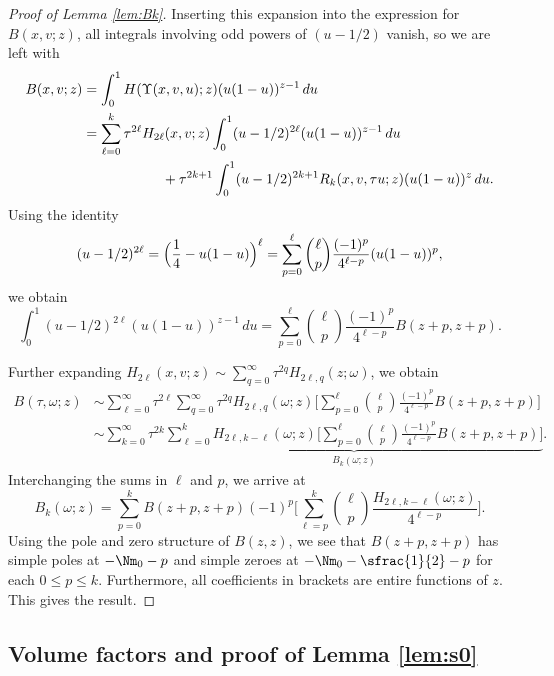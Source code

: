 \begin{proof}[Proof of Lemma \ref{lem:Bk}]
Inserting this expansion into the expression for $B(x,v; z)$, all integrals involving odd powers of $(u-1/2)$ vanish, so we
are left with
\begin{align*}
B(x,v; z) &= \int_0^1 H(\Upsilon(x,v,u); z) (u(1-u))^{z-1}\,du \\
&= \sum_{\ell=0}^{k} \tau^{2\ell} H_{2\ell}(x,v; z) \int_0^1 (u-1/2)^{2\ell} (u(1-u))^{z-1}\,du \\
&\hspace*{2cm} + \tau^{2k+1} \int_0^1 (u-1/2)^{2k+1} R_{k} (x,v,\tau u; z) (u(1-u))^z\,du.
\end{align*}
Using the identity
\begin{equation*}
(u-1/2)^{2\ell} = \Bigl(\frac{1}{4} - u(1-u) \Bigr)^\ell = \sum_{p=0}^\ell \binom{\ell}{p} \frac{(-1)^p}{4^{\ell-p}} (u(1-u))^p,
\end{equation*}
we obtain
\begin{equation*}
\int_0^1 (u-1/2)^{2\ell} (u(1-u))^{z-1}\,du = \sum_{p=0}^\ell \binom{\ell}{p} \frac{(-1)^p}{4^{\ell-p}} B(z+p,z+p).
\end{equation*}

Further expanding $H_{2\ell} (x,v; z) \sim \sum_{q=0}^\infty \tau^{2q} H_{2\ell, q} (z; \omega)$, we obtain
\begin{align*}
B(\tau,\omega; z) &\sim \sum_{\ell=0}^{\infty} \tau^{2\ell} \sum_{q=0}^{\infty} \tau^{2q} H_{2\ell, q}(\omega; z) \biggl[\sum_{p=0}^\ell \binom{\ell}{p} \frac{(-1)^p}{4^{\ell-p}} B(z+p,z+p) \biggr] \\
&\sim \sum_{k=0}^\infty \tau^{2k} \underbrace{\sum_{\ell=0}^k H_{2\ell, k-\ell}(\omega; z) \biggl[\sum_{p=0}^\ell \binom{\ell}{p} \frac{(-1)^p}{4^{\ell-p}} B(z+p,z+p) \biggr]}_{B_k(\omega; z)}.
\end{align*}
Interchanging the sums in $\ell$ and $p$, we arrive at
\begin{equation*}
B_k(\omega; z) = \sum_{p=0}^k B(z+p, z+p) (-1)^p \biggl[\sum_{\ell=p}^k \binom{\ell}{p} \frac{H_{2\ell, k-\ell}(\omega; z)}{4^{\ell-p}} \biggr].
\end{equation*}
Using the pole and zero structure of $B(z,z)$, we see that $B(z+p,z+p)$ has simple poles at $-\Nm_0 - p$ and simple zeroes
at $-\Nm_0 - \sfrac{1}{2} - p$ for each $0\le p\le k$. Furthermore, all coefficients in brackets are entire functions of $z$.
This gives the result.
\end{proof}

\subsection{Volume factors and proof of Lemma \ref{lem:s0}} \label{sec:volumeFactors}

